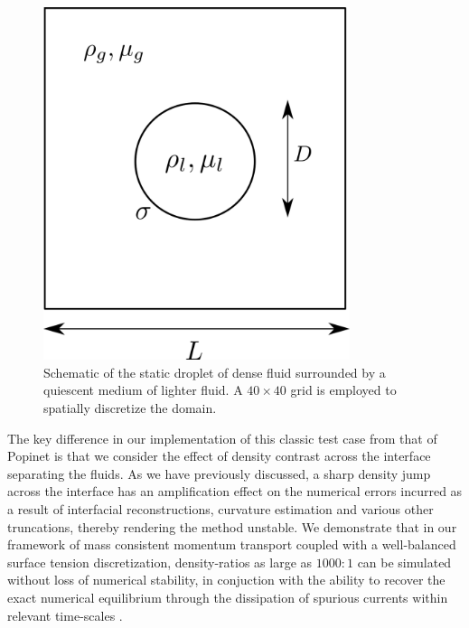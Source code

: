 \begin{figure}[h!]
    \centering
    \includegraphics[width = 0.8\textwidth]{plots/static_drop/config.png}
    \caption{Schematic of the static droplet of dense fluid surrounded by a quiescent medium of lighter fluid. A $40 \times 40$ grid is employed to spatially discretize the domain.}
    \label{static_conf}
\end{figure}

The key difference in our implementation of this classic test case from that of Popinet  is that we consider the effect of density contrast across the interface separating the fluids. As we have previously discussed, a sharp density jump across the interface has an amplification effect on the numerical errors incurred as a result of interfacial reconstructions, curvature estimation and various other truncations, thereby rendering the method unstable. We demonstrate that in our framework of mass consistent momentum transport coupled with a well-balanced surface tension discretization, density-ratios as large as $1000:1$ can be simulated without loss of numerical stability, in conjuction with the ability to recover the exact numerical equilibrium through the dissipation of spurious currents within relevant time-scales .

